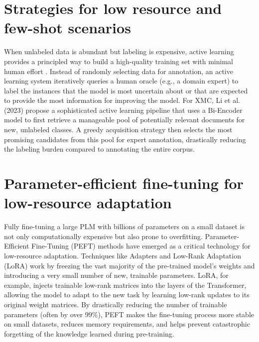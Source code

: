 \section{Strategies for low resource and few-shot scenarios}

When unlabeled data is abundant but labeling is expensive, active learning provides a principled way to build a high-quality training set with minimal human effort \cite{li-etal-2023-enhancing-extreme}. Instead of randomly selecting data for annotation, an active learning system iteratively queries a human oracle (e.g., a domain expert) to label the instances that the model is most uncertain about or that are expected to provide the most information for improving the model. For XMC, Li et al. (2023) propose a sophisticated active learning pipeline that uses a Bi-Encoder model to first retrieve a manageable pool of potentially relevant documents for new, unlabeled classes. A greedy acquisition strategy then selects the most promising candidates from this pool for expert annotation, drastically reducing the labeling burden compared to annotating the entire corpus.\cite{li2024surveyDAL}

\section{Parameter-efficient fine-tuning for low-resource adaptation}

Fully fine-tuning a large PLM with billions of parameters on a small dataset is not only computationally expensive but also prone to overfitting. Parameter-Efficient Fine-Tuning (PEFT) methods have emerged as a critical technology for low-resource adaptation. \cite{su-etal-2024-unlocking} Techniques like Adapters and Low-Rank Adaptation (LoRA) work by freezing the vast majority of the pre-trained model's weights and introducing a very small number of new, trainable parameters. LoRA, for example, injects trainable low-rank matrices into the layers of the Transformer, allowing the model to adapt to the new task by learning low-rank updates to its original weight matrices. By drastically reducing the number of trainable parameters (often by over 99\%), PEFT makes the fine-tuning process more stable on small datasets, reduces memory requirements, and helps prevent catastrophic forgetting of the knowledge learned during pre-training.~\cite{liu2024alora,razuvayevskaya2024comparison}

